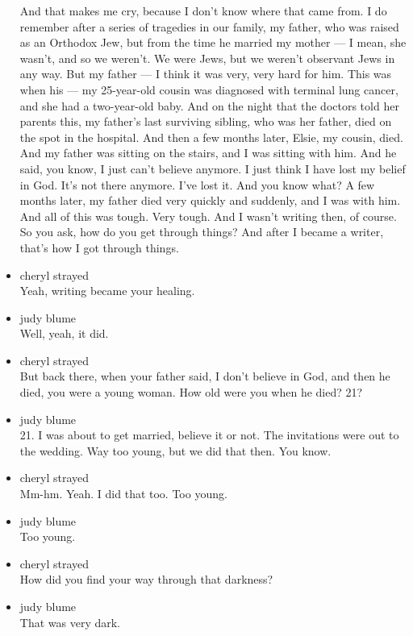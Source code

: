 \begin{itemize}
  And that makes me cry, because I don't know where that came from. I do
  remember after a series of tragedies in our family, my father, who was
  raised as an Orthodox Jew, but from the time he married my mother ---
  I mean, she wasn't, and so we weren't. We were Jews, but we weren't
  observant Jews in any way. But my father --- I think it was very, very
  hard for him. This was when his --- my 25-year-old cousin was
  diagnosed with terminal lung cancer, and she had a two-year-old baby.
  And on the night that the doctors told her parents this, my father's
  last surviving sibling, who was her father, died on the spot in the
  hospital. And then a few months later, Elsie, my cousin, died. And my
  father was sitting on the stairs, and I was sitting with him. And he
  said, you know, I just can't believe anymore. I just think I have lost
  my belief in God. It's not there anymore. I've lost it. And you know
  what? A few months later, my father died very quickly and suddenly,
  and I was with him. And all of this was tough. Very tough. And I
  wasn't writing then, of course. So you ask, how do you get through
  things? And after I became a writer, that's how I got through things.
\item
  cheryl strayed\\
  Yeah, writing became your healing.
\item
  judy blume\\
  Well, yeah, it did.
\item
  cheryl strayed\\
  But back there, when your father said, I don't believe in God, and
  then he died, you were a young woman. How old were you when he died?
  21?
\item
  judy blume\\
  21. I was about to get married, believe it or not. The invitations
  were out to the wedding. Way too young, but we did that then. You
  know.
\item
  cheryl strayed\\
  Mm-hm. Yeah. I did that too. Too young.
\item
  judy blume\\
  Too young.
\item
  cheryl strayed\\
  How did you find your way through that darkness?
\item
  judy blume\\
  That was very dark.


\end{itemize}

